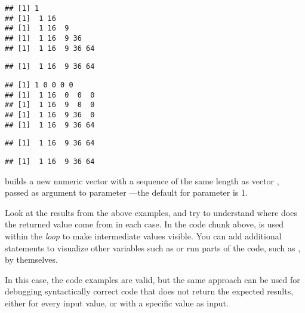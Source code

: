 \documentclass[krantz2]{krantz}\usepackage{knitr}%
\begin{document}
\begin{knitrout}
\begin{kframe}
\begin{alltt}
 \hlkwb{<-} \hlstd{()}
  \hlstd{(} 
   \hlkwb{<-} \hlopt{^}
\hlstd{\}}
\end{alltt}
\begin{verbatim}
## [1] 1
## [1]  1 16
## [1]  1 16  9
## [1]  1 16  9 36
## [1]  1 16  9 36 64
\end{verbatim}
\begin{alltt}
 
\end{alltt}
\begin{verbatim}
## [1]  1 16  9 36 64
\end{verbatim}
\begin{alltt}
 \hlkwb{<-} \hlstd{(}
  \hlstd{(} 
   \hlkwb{<-} \hlopt{^}
\hlstd{\}}
\end{alltt}
\begin{verbatim}
## [1] 1 0 0 0 0
## [1]  1 16  0  0  0
## [1]  1 16  9  0  0
## [1]  1 16  9 36  0
## [1]  1 16  9 36 64
\end{verbatim}
\begin{alltt}
 
\end{alltt}
\begin{verbatim}
## [1]  1 16  9 36 64
\end{verbatim}
\begin{alltt}
 \hlkwb{<-} \hlopt{^}
\end{alltt}
\begin{verbatim}
## [1]  1 16  9 36 64
\end{verbatim}
\end{kframe}
\end{knitrout}

 builds a new numeric vector with a sequence of the same length as vector , passed as argument to parameter ---the default for parameter  is 1.

\begin{playground}\label{box:play:forloop}
Look at the results from the above examples, and try to understand where does the returned value come from in each case. In the code chunk above,  is used within the \emph{loop} to make intermediate values visible. You can add additional  statements to visualize other variables such as  or run parts of the code, such as , by themselves.

In this case, the code examples are valid, but the same approach can be used for debugging syntactically correct code that does not return the expected results, either for every input value, or with a specific value as input.
\end{playground}
\end{document}
